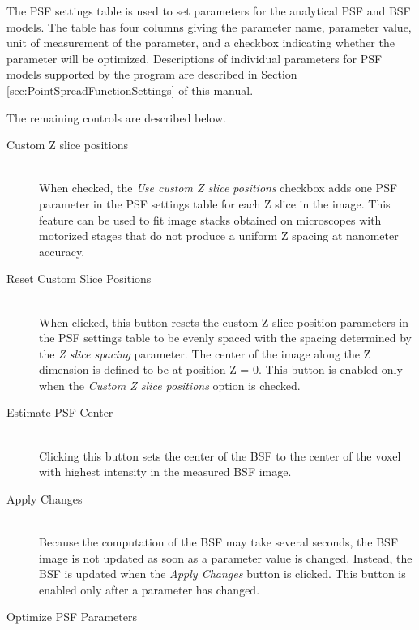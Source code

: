 \documentclass[11pt,titlepage,twoside]{article}
\begin{document}
The PSF settings table is used to set parameters for the analytical PSF and BSF models. The table has four columns giving the parameter name, parameter value, unit of measurement of the parameter, and a checkbox indicating whether the parameter will be optimized. Descriptions of individual parameters for PSF models supported by the program are described in Section \ref{sec:PointSpreadFunctionSettings} of this manual.

The remaining controls are described below.

\begin{description}

  \item[Custom Z slice positions] \hfill \\
  
When checked, the \emph{Use custom Z slice positions} checkbox adds one PSF parameter in the PSF settings table for each Z slice in the image. This feature can be used to fit image stacks obtained on microscopes with motorized stages that do not produce a uniform Z spacing at nanometer accuracy.

  \item[Reset Custom Slice Positions] \hfill \\
  
When clicked, this button resets the custom Z slice position parameters in the PSF settings table to be evenly spaced with the spacing determined by the \emph{Z slice spacing} parameter. The center of the image along the Z dimension is defined to be at position Z = 0. This button is enabled only when the \emph{Custom Z slice positions} option is checked.

  \item[Estimate PSF Center] \hfill \\
  
Clicking this button sets the center of the BSF to the center of the voxel with highest intensity in the measured BSF image.

  \item[Apply Changes] \hfill \\
  
  Because the computation of the BSF may take several seconds, the BSF image is not updated as soon as a parameter value is changed. Instead, the BSF is updated when the \emph{Apply Changes} button is clicked. This button is enabled only after a parameter has changed.
  
  \item[Optimize PSF Parameters] \hfill \\
  

\end{description}
\end{document}
